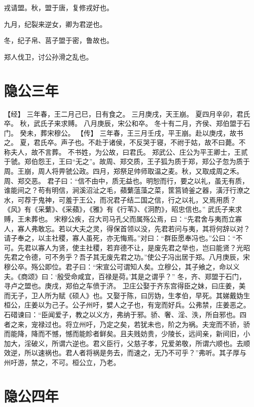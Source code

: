 \documentclass[a4paper,12pt,UTF8,twoside]{ctexbook}
\begin{document}
戎请盟。秋，盟于唐，复修戎好也。

九月，纪裂来逆女，卿为君逆也。

冬，纪子帛、莒子盟于密，鲁故也。

郑人伐卫，讨公孙滑之乱也。

\chapter{隐公三年}

【经】
三年春，王二月己巳，日有食之。
三月庚戌，天王崩。
夏四月辛卯，君氏卒。
秋，武氏子来求赙。
八月庚辰，宋公和卒。
冬十有二月，齐侯、郑伯盟于石门。
癸未，葬宋穆公。
【传】
三年春，王三月壬戌，平王崩。赴以庚戌，故书之。
夏，君氏卒。声子也。不赴于诸侯，不反哭于寝，不祔于姑，故不曰薨。不称夫人，故不言葬。
不书姓，为公故，曰君氏。
郑武公、庄公为平王卿士，王贰于虢。郑伯怨王，王曰“无之”。故周、郑交质，王子狐为质于郑，郑公子忽为质于周。王崩，周人将畀虢公政。四月，郑祭足帅师取温之麦。秋，又取成周之禾。周、郑交恶。
君子曰：“信不由中，质无益也。明恕而行，要之以礼，虽无有质，谁能间之？苟有明信，涧溪沼沚之毛，蘋蘩蕰藻之菜，筐筥锜釜之器，潢汙行潦之水，可荐于鬼神，可羞于王公，而况君子结二国之信，行之以礼，又焉用质？《风》有《采蘩》、《采蘋》，《雅》有《行苇》、《泂酌》，昭忠信也。”
武氏子来求赙，王未葬也。
宋穆公疾，召大司马孔父而属殇公焉，曰：“先君舍与夷而立寡人，寡人弗敢忘。若以大夫之灵，得保首领以没，先君若问与夷，其将何辞以对？请子奉之，以主社稷，寡人虽死，亦无悔焉。”对曰：“群臣愿奉冯也。”公曰：“不可。先君以寡人为贤，使主社稷，若弃德不让，是废先君之举也，岂曰能贤？光昭先君之令德，可不务乎？吾子其无废先君之功。”使公子冯出居于郑。八月庚辰，宋穆公卒。殇公即位。君子曰：“宋宣公可谓知人矣。立穆公，其子飨之，命以义夫。《商颂》曰：‘殷受命咸宜，百禄是荷。’其是之谓乎？”
冬，齐、郑盟于石门，寻卢之盟也。庚戌，郑伯之车偾于济。
卫庄公娶于齐东宫得臣之妹，曰庄姜，美而无子，卫人所为赋《硕人》也。又娶于陈，曰厉妫，生孝伯，早死。其娣戴妫生桓公，庄姜以为己子。公子州吁，嬖人之子也，有宠而好兵。公弗禁，庄姜恶之。
石碏谏曰：“臣闻爱子，教之以义方，弗纳于邪。骄、奢、淫、泆，所自邪也。四者之来，宠禄过也。将立州吁，乃定之矣，若犹未也，阶之为祸。夫宠而不骄，骄而能降，降而不憾，憾而能眕者鲜矣。且夫贱妨贵，少陵长，远间亲，新间旧，小加大，淫破义，所谓六逆也。君义臣行，父慈子孝，兄爱弟敬，所谓六顺也。去顺效逆，所以速祸也。君人者将祸是务去，而速之，无乃不可乎？”弗听。其子厚与州吁游，禁之，不可。桓公立，乃老。

\chapter{隐公四年}
\end{document}

